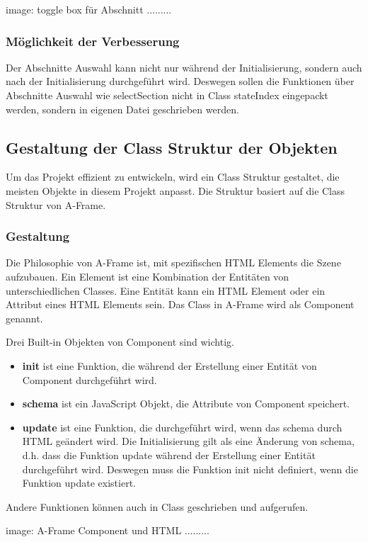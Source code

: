   image: toggle box für Abschnitt .........
  
  \subsubsection{Möglichkeit der Verbesserung}
  Der Abschnitte Auswahl kann nicht nur während der Initialisierung, sondern auch nach der Initialisierung durchgeführt wird. Deswegen sollen die Funktionen über Abschnitte Auswahl wie selectSection nicht in Class stateIndex eingepackt werden, sondern in eigenen Datei geschrieben werden.
  
 \subsection{Gestaltung der Class Struktur der Objekten}
 Um das Projekt effizient zu entwickeln, wird ein Class Struktur gestaltet, die meisten Objekte in diesem Projekt anpasst. Die Struktur basiert auf die Class Struktur von A-Frame.
 
 \subsubsection{Gestaltung}
 Die Philosophie von A-Frame ist, mit spezifischen HTML Elements die Szene aufzubauen. Ein Element ist eine Kombination der Entitäten von unterschiedlichen Classes. Eine Entität kann ein HTML Element oder ein Attribut eines HTML Elements sein. Das Class in A-Frame wird als Component genannt.
 
 Drei Built-in Objekten von Component sind wichtig.
 \begin{itemize}
     \item \textbf{init} ist eine Funktion, die während der Erstellung einer Entität von Component durchgeführt wird.
     \item \textbf{schema} ist ein JavaScript Objekt, die Attribute von Component speichert.
     \item \textbf{update} ist eine Funktion, die durchgeführt wird, wenn das schema durch HTML geändert wird. Die Initialisierung gilt als eine Änderung von schema, d.h. dass die Funktion update während der Erstellung einer Entität durchgeführt wird. Deswegen muss die Funktion init nicht definiert, wenn die Funktion update existiert.
 \end{itemize}
 Andere Funktionen können auch in Class geschrieben und aufgerufen.
 
 image: A-Frame Component und HTML .........
 
